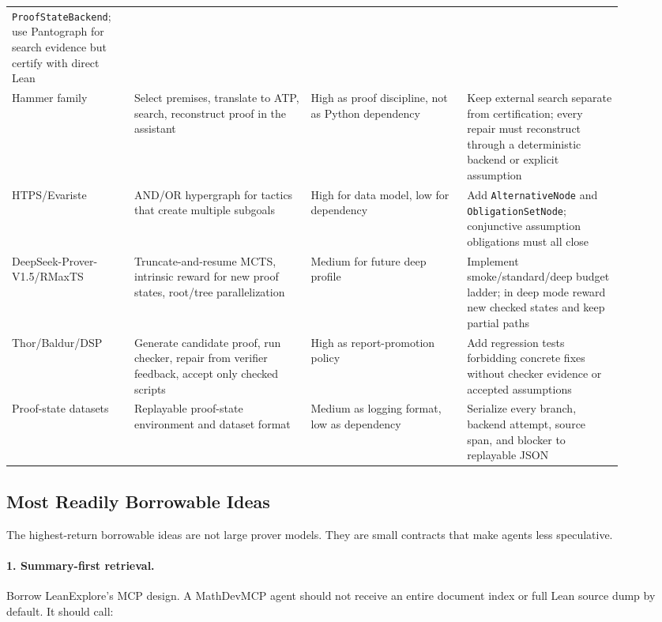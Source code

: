 \documentclass[11pt]{article}
\begin{document}
\begin{small}
\begin{longtable}{p{0.18\linewidth}p{0.26\linewidth}p{0.23\linewidth}p{0.23\linewidth}}
\texttt{ProofStateBackend}; use Pantograph for search evidence but certify with
direct Lean \\
\addlinespace
Hammer family & Select premises, translate to ATP,
search, reconstruct proof in the assistant & High as proof discipline, not as
Python dependency & Keep external search separate from certification; every
repair must reconstruct through a deterministic backend or explicit assumption \\
\addlinespace
HTPS/Evariste & AND/OR hypergraph for tactics that create multiple subgoals &
High for data model, low for dependency & Add \texttt{AlternativeNode} and
\texttt{ObligationSetNode}; conjunctive assumption obligations must all close \\
\addlinespace
DeepSeek-Prover-V1.5/RMaxTS & Truncate-and-resume MCTS, intrinsic reward for
new proof states, root/tree parallelization & Medium for future deep profile &
Implement smoke/standard/deep budget ladder; in deep mode reward new checked
states and keep partial paths \\
\addlinespace
Thor/Baldur/DSP & Generate candidate proof, run checker, repair from verifier
feedback, accept only checked scripts & High as report-promotion policy & Add
regression tests forbidding concrete fixes without checker evidence or accepted
assumptions \\
\addlinespace
Proof-state datasets & Replayable proof-state environment and dataset
format & Medium as logging format, low as dependency & Serialize every branch,
backend attempt, source span, and blocker to replayable JSON \\
\bottomrule
\end{longtable}
\end{small}

\subsection{Most Readily Borrowable Ideas}

The highest-return borrowable ideas are not large prover models. They are
small contracts that make agents less speculative.

\paragraph{1. Summary-first retrieval.}
Borrow LeanExplore's MCP design. A MathDevMCP agent should not receive an
entire document index or full Lean source dump by default. It should call:
\end{document}
